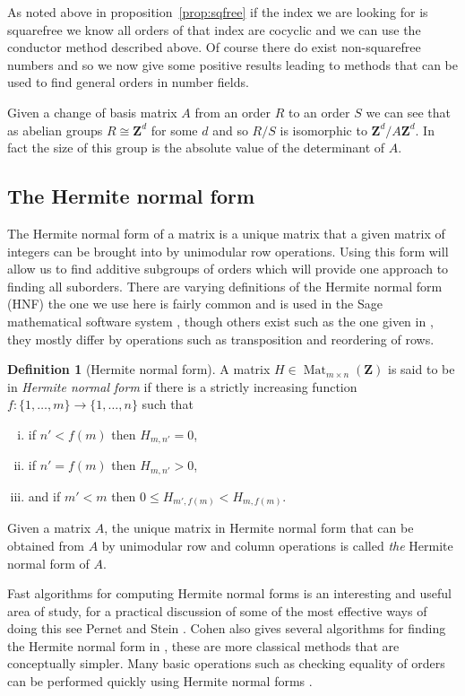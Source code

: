 \documentclass[12pt,a4paper,abstracton,bibtotoc]{scrreprt}
\theoremstyle{definition}
\newtheorem{defn}{Definition}
\newcommand{\ZZ}{\mathbf{Z}}
\DeclareMathOperator{\Mat}{Mat}
\begin{document}
As noted above in proposition~\ref{prop:sqfree} if the index we are looking for is squarefree we know all orders of that index are cocyclic and we can use the conductor method described above.
Of course there do exist non-squarefree numbers and so we now give some positive results leading to methods that can be used to find general orders in number fields.

Given a change of basis matrix $A$ from an order $R$ to an order $S$ we can see that as abelian groups $R \cong \ZZ^d$ for some $d$ and so $R/S$ is isomorphic to $\ZZ^d/A\ZZ^d$.
In fact the size of this group is the absolute value of the determinant of $A$.

\subsection{The Hermite normal form}
The Hermite normal form of a matrix is a unique matrix that a given matrix of integers can be brought into by unimodular row operations.
Using this form will allow us to find additive subgroups of orders which will provide one approach to finding all suborders.
There are varying definitions of the Hermite normal form (HNF) the one we use here is fairly common and is used in the Sage mathematical software system \cite{sage}, though others exist such as the one given in \cite{cohen93}, they mostly differ by operations such as transposition and reordering of rows.

\begin{defn}[Hermite normal form] %
A matrix $H\in\Mat_{m\times n}(\ZZ)$ is said to be in \emph{Hermite normal form} if there is a strictly increasing function $f\colon \{1, \ldots, m\} \to \{1,\ldots , n\}$ such that
\begin{enumerate}[i)]
\item if $n' < f(m)$ then $H_{m,n'} = 0$,
\item if $n' = f(m)$ then $H_{m,n'} > 0$,
\item and if $m' < m$ then $0\le H_{m',f(m)} < H_{m,f(m)}$.
\end{enumerate}

Given a matrix $A$, the unique matrix in Hermite normal form that can be obtained from $A$ by unimodular row and column operations is called \emph{the} Hermite normal form of $A$.
\end{defn}

Fast algorithms for computing Hermite normal forms is an interesting and useful area of study, for a practical discussion of some of the most effective ways of doing this see Pernet and Stein \cite{pernetstein}.
Cohen also gives several algorithms for finding the Hermite normal form in \cite{cohen93}, these are more classical methods that are conceptually simpler.
Many basic operations such as checking equality of orders can be performed quickly using Hermite normal forms \cite{cohen93}.  %
\end{document}

